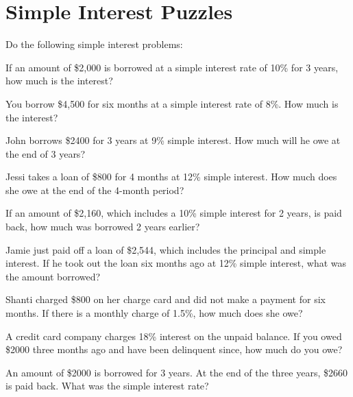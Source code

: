 \section{Simple Interest Puzzles}

Do the following simple interest problems:

\begin{puzzle}
    If an amount of \$2,000 is borrowed at a simple interest rate of 10\% for 3 years, how much is the interest?
\end{puzzle}

\begin{puzzle}
    You borrow \$4,500 for six months at a simple interest rate of 8\%. How much is the interest?
\end{puzzle}

\begin{puzzle}
    John borrows \$2400 for 3 years at 9\% simple interest. How much will he owe at the end of 3 years?
\end{puzzle}

\begin{puzzle}
    Jessi takes a loan of \$800 for 4 months at 12\% simple interest. How much does she owe at the end of the 4-month period?
\end{puzzle}

\begin{puzzle}
    If an amount of \$2,160, which includes a 10\% simple interest for 2 years, is paid back, how much was borrowed 2 years earlier?
\end{puzzle}

\begin{puzzle}
    Jamie just paid off a loan of \$2,544, which includes the principal and simple interest. If he took out the loan six months ago at 12\% simple interest, what was the amount borrowed?
\end{puzzle}

\begin{puzzle}
    Shanti charged \$800 on her charge card and did not make a payment for six months. If there is a monthly charge of 1.5\%, how much does she owe?
\end{puzzle}

\begin{puzzle}
    A credit card company charges 18\% interest on the unpaid balance. If you owed \$2000 three months ago and have been delinquent since, how much do you owe?
\end{puzzle}

\begin{puzzle}
    An amount of \$2000 is borrowed for 3 years. At the end of the three years, \$2660 is paid back. What was the simple interest rate?
\end{puzzle}

